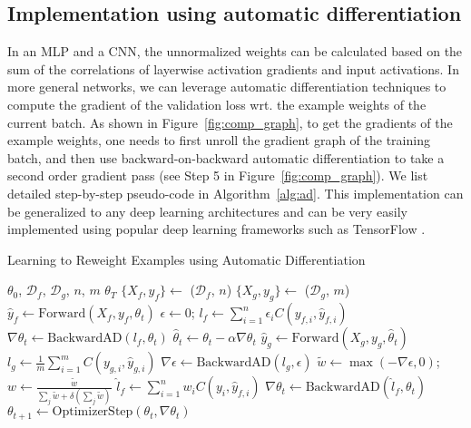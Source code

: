 \subsection{Implementation using automatic differentiation}
 In an MLP and a CNN, the unnormalized weights can be calculated based on
the sum of the correlations of layerwise activation gradients and input activations. In more general
networks, we can leverage automatic differentiation techniques to compute the gradient of the
validation loss wrt. the example weights of the current batch. As shown in
Figure~\ref{fig:comp_graph}, to get the gradients of the example weights, one needs to first unroll
the gradient graph of the training batch, and then use backward-on-backward automatic
differentiation to take a second order gradient pass (see Step 5 in Figure~\ref{fig:comp_graph}). We
list detailed step-by-step pseudo-code in Algorithm~\ref{alg:ad}. This implementation can be
generalized to any deep learning architectures and can be very easily implemented using popular deep
learning frameworks such as TensorFlow \cite{tensorflow}.

\begin{minipage}{\columnwidth}
\begin{algorithm}[H]
\caption{Learning to Reweight Examples using Automatic Differentiation}
\label{alg:ad}
\begin{algorithmic}[1]
\REQUIRE $\theta_0$, $\mathcal{D}_f$, $\mathcal{D}_g$, $n$, $m$
\ENSURE $\theta_T$
\STATE $\{X_f, y_f\} \gets$ ($\mathcal{D}_f$, $n$)
\STATE $\{X_g, y_g\} \gets$ ($\mathcal{D}_g$, $m$)
\STATE $\hat{y}_f \gets \text{Forward}(X_{f}, y_{f}, \theta_t)$
\STATE $\epsilon \gets 0$; $l_f \gets \sum_{i=1}^n \epsilon_i C(y_{f,i}, \hat{y}_{f,i})$
\STATE $\nabla \theta_t \gets \text{BackwardAD}(l_f, \theta_t)$
\STATE $\hat{\theta}_t \gets \theta_t - \alpha \nabla \theta_t$
\STATE $\hat{y}_g \gets \text{Forward}(X_{g}, y_{g}, \hat{\theta}_t)$
\STATE $l_g \gets \frac{1}{m} \sum_{i=1}^m C(y_{g,i}, \hat{y}_{g,i})$
\STATE $\nabla \epsilon \gets \text{BackwardAD}(l_g, \epsilon)$  \label{lst:line:bb}
\STATE $\tilde{w} \gets \max(-\nabla \epsilon, 0)$; $w \gets \frac{\tilde{w}}{\sum_j \tilde{w} + \delta(\sum_j \tilde{w})}$
\STATE $\hat{l}_f \gets \sum_{i=1}^n w_i C(y_i, \hat{y}_{f,i})$
\STATE $\nabla \theta_t \gets \text{BackwardAD}(\hat{l}_f, \theta_t)$
\STATE $\theta_{t+1} \gets \text{OptimizerStep}(\theta_t, \nabla \theta_t)$
\ENDFOR
\end{algorithmic}
\end{algorithm}
\end{minipage}

